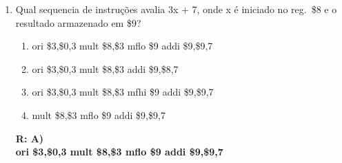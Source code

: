 \documentclass[a4paper,11pt,fleqn]{article}
\begin{document}
\begin{enumerate}
    \item{Qual sequencia de instruções avalia 3x + 7, onde x é iniciado no reg.\ \$8 e o resultado
            armazenado em \$9?}
        \begin{enumerate}
            \item{ori \$3,\$0,3 \newline mult \$8,\$3 \newline mflo \$9 \newline addi \$9,\$9,7}
            \item{ori \$3,\$0,3 \newline mult \$8,\$3 \newline addi \$9,\$8,7}
            \item{ori \$3,\$0,3 \newline mult \$8,\$3 \newline mfhi \$9 \newline addi \$9,\$9,7}
            \item{mult \$8,\$3 \newline mflo \$9 \newline addi \$9,\$9,7}
        \end{enumerate}
        \textbf{R: A)\\ ori \$3,\$0,3 \newline mult \$8,\$3 \newline mflo \$9 \newline addi \$9,\$9,7}
\end{enumerate}
\newpage
{}
\end{document}
